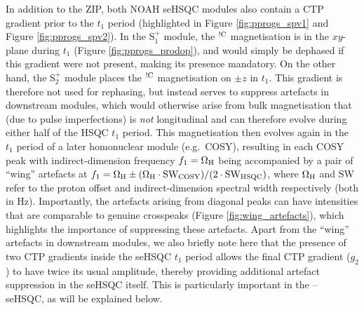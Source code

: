 \documentclass[11pt]{article}
\newcommand*{\noahSpa}{S$^+_1$}
\newcommand*{\noahSpb}{S$^+_2$}
\newcommand*{\hl}[1]{\textcolor{WildStrawberry}{#1}}
\newcommand*{\proton}{\ce{^{1}H}}
\newcommand*{\nitrogen}{\ce{^{15}N}}
\newcommand*{\magnnot}[1]{\ce{^1H}$^{!#1}$}
\newcommand*{\figref}[1]{Figure \ref{fig:#1}}
\begin{document}
In addition to the ZIP, \hl{both NOAH seHSQC modules} also contain a CTP gradient prior to the $t_1$ period (highlighted in \figref{pprogs_spv1} and \figref{pprogs_spv2}).
\hl{
    In the \noahSpa{} module, the \magnnot{\ce{C}} magnetisation is in the $xy$-plane during $t_1$ (\figref{pprogs_prodop}), and would simply be dephased if this gradient were not present, making its presence mandatory.
On the other hand, the \noahSpb{} module places the \magnnot{\ce{C}} magnetisation on $\pm z$ in $t_1$.
This gradient is therefore not used for rephasing, but instead serves to suppress artefacts in downstream modules, which would otherwise arise from bulk magnetisation that (due to pulse imperfections) is \textit{not} longitudinal and can therefore evolve during either half of the HSQC $t_1$ period.
}
This magnetisation then evolves again in the $t_1$ period of a later homonuclear module (e.g.\ COSY), resulting in each COSY peak with indirect-dimension frequency $f_1 = \Omega_{\ce{H}}$ being accompanied by a pair of ``wing'' artefacts at $f_1 = \Omega_{\ce{H}} \pm (\Omega_{\ce{H}}\cdot\mathrm{SW_{COSY}})/(2\cdot \mathrm{SW_{HSQC}})$, where $\Omega_{\ce{H}}$ and SW refer to the proton offset and indirect-dimension spectral width respectively (both in Hz).
Importantly, the artefacts arising from diagonal peaks can have intensities that are comparable to genuine crosspeaks (\figref{wing_artefacts}), which highlights the importance of suppressing these artefacts.
\hl{Apart from the ``wing'' artefacts in downstream modules,} we also briefly note here that the presence of two CTP gradients inside the seHSQC $t_1$ period allows the final CTP gradient ($g_2$) to have twice its usual amplitude, thereby providing additional artefact suppression \hl{in the seHSQC itself}.
This is particularly important in the \nitrogen{}--\proton{} seHSQC, as will be explained below.
\end{document}
